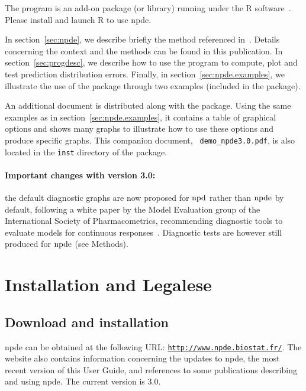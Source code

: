 \documentclass[12pt,a4paper]{article}
\def\npde{{\rm npde}}
\def\npd{{\rm npd}}
\begin{document}
The program is an add-on package (or library) running under the {\sf R} software~\cite{R}. Please install and launch {\sf R} to use {\sf npde}.

\bigskip

In section~\ref{sec:npde}, we describe briefly the method referenced in~\cite{Brendel06}. Details concerning the context and the methods can be found in this publication. In section~\ref{sec:progdesc}, we describe how to use the program to compute, plot and test prediction distribution errors. Finally, in section~\ref{sec:npde.examples}, we illustrate the use of the package through two examples (included in the package).

An additional document is distributed along with the package. Using the same examples as in section~\ref{sec:npde.examples}, it contains a table of graphical options and shows many graphs to illustrate how to use these options and produce specific graphs. This companion document, \verb+ demo_npde3.0.pdf+, is also located in the \texttt{inst} directory of the package.

\paragraph{Important changes with version 3.0:} the default diagnostic graphs are now proposed for $\npd$ rather than $\npde$ by default, following a white paper by the Model Evaluation group of the International Society of Pharmacometrics, recommending diagnostic tools to evaluate models for continuous responses~\cite{Nguyen17}. Diagnostic tests are however still produced for $\npde$ (see Methods).

\clearpage

\section{Installation and Legalese}

\subsection{Download and installation}

\hskip 18pt {\sf npde} can be obtained at the following URL: 
\href{http://www.npde.biostat.fr/}{\texttt{http://www.npde.biostat.fr/}}. The website also contains information concerning the updates to {\sf npde}, the most recent version of this User Guide, and references to some publications describing and using {\sf npde}. The current version is 3.0. 
\end{document}

